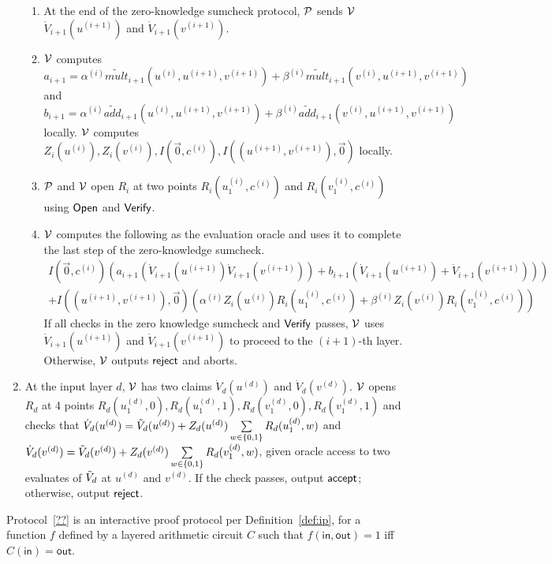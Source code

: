 \begin{enumerate}
\begin{enumerate}
	\item At the end of the zero-knowledge sumcheck protocol, $\P$ sends $\V$ $\dot{V}_{i+1}(u^{(i+1)})$ and $\dot{V}_{i+1}(v^{(i+1)})$.
	
	\item $\V$ computes $a_{i+1} = \alpha^{(i)}\tilde{mult}_{i+1}(u^{(i)}, u^{(i+1)}, v^{(i+1)})+\beta^{(i)}\tilde{mult}_{i+1}(v^{(i)}, u^{(i+1)}, v^{(i+1)})$ and $b_{i+1} = \alpha^{(i)}\tilde{add}_{i+1}(u^{(i)}, u^{(i+1)}, v^{(i+1)})+\beta^{(i)}\tilde{add}_{i+1}(v^{(i)}, u^{(i+1)}, v^{(i+1)})$ locally. $\V$ computes $Z_i(u^{(i)}),Z_i(v^{(i)}),I(\vec{0},c^{(i)}), I((u^{(i+1)},v^{(i+1)}),\vec{0})$ locally.
	\item $\P$ and $\V$ open $R_i$ at two points $R_i(u_1^{(i)},c^{(i)})$ and $R_i(v_1^{(i)},c^{(i)})$ using $\Open$ and $\Verify$.
	\item $\V$ computes the following as the evaluation oracle and uses it to complete the last step of the zero-knowledge sumcheck.
	\begin{align*}
		I(\vec{0},c^{(i)})(a_{i+1}(\dot{V}_{i+1}(u^{(i+1)})\dot{V}_{i+1}(v^{(i+1)}))+b_{i+1}(\dot{V}_{i+1}(u^{(i+1)})+\dot{V}_{i+1}(v^{(i+1)})))\\
		+I((u^{(i+1)},v^{(i+1)}),\vec{0})(\alpha^{(i)}Z_i(u^{(i)})R_i(u_1^{(i)}, c^{(i)})+\beta^{(i)}Z_i(v^{(i)})R_i(v_1^{(i)}, c^{(i)}))
	\end{align*}
	If all checks in the zero knowledge sumcheck and $\Verify$ passes, $\V$ uses $\dot{V}_{i+1}(u^{(i+1)})$ and $\dot{V}_{i+1}(v^{(i+1)})$ to proceed to the $(i+1)$-th layer. Otherwise, $\V$ outputs $\reject$ and aborts.
	
	\end{enumerate}

\item At the input layer $d$, $\V$ has two claims $\dot{V}_{d}(u^{(d)})$ and $\dot{V}_{d}(v^{(d)})$. $\V$ opens $R_d$ at 4 points $R_d(u_1^{(d)},0),R_d(u_1^{(d)},1),R_d(v_1^{(d)},0),R_d(v_1^{(d)},1)$ and checks that $\dot{V}_{d}(u^{(d)}) = \tV_d(u^{(d)})+Z_d(u^{(d)})\sum\limits_{w \in \binary}R_d(u_1^{(d)},w)$ and $\dot{V}_{d}(v^{(d)}) = \tV_d(v^{(d)})+Z_d(v^{(d)})\sum\limits_{w \in \binary}R_d(v_1^{(d)},w)$, given oracle access to two evaluates of $\tV_d$ at $u^{(d)}$ and $v^{(d)}$. If the check passes, output $\accept$; otherwise, output $\reject$.

\end{enumerate}

\begin{theorem}
	Protocol~\ref{??} is an interactive proof protocol per Definition~\ref{def:ip}, for a function $f$ defined by a layered arithmetic circuit $C$ such that $f(\mathsf{in},\mathsf{out}) = 1$ iff $C(\mathsf{in}) = \mathsf{out}$.
\end{theorem}

